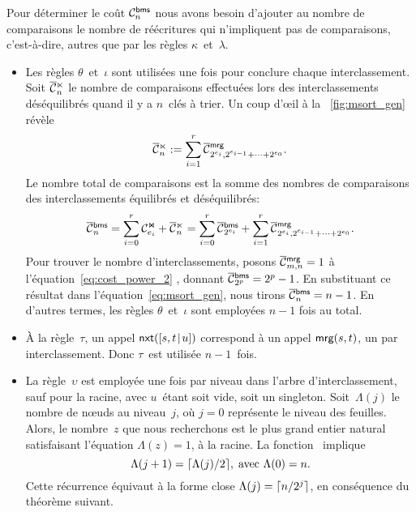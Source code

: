 Pour déterminer le coût
\(\C{\fun{bms}}{n}\) nous avons besoin
d'ajouter au nombre de comparaisons le nombre de réécritures qui
n'impliquent pas de comparaisons, c'est-à-dire, autres que par les
règles \(\kappa\)~et~\(\lambda\).
\begin{itemize}

\item Les règles \(\theta\)~et~\(\iota\) sont utilisées une fois pour
  conclure chaque interclassement. Soit
  \(\OC{\ltimes}{n}\) le nombre de
  comparaisons effectuées lors des interclassements déséquilibrés
  quand il y a \(n\)~clés à trier. Un coup d'{\oe}il à la
  \fig~\vref{fig:msort_gen} révèle
    \begin{equation}
      \OC{\ltimes}{n} :=
      \sum_{i=1}^{r}{\OC{\fun{mrg}}{2^{e_i},2^{e_{i-1}}+\dots+2^{e_0}}}.
      \label{eq:C_unbal}
    \end{equation}
    Le nombre total de comparaisons est la somme des nombres de
    comparaisons des interclassements équilibrés et déséquilibrés:
    \begin{equation}
      \OC{\fun{bms}}{n}
      = \sum_{i=0}^{r}{\C{\Join}{e_i}}
      +
      \OC{\ltimes}{n}
      = \sum_{i=0}^{r}{\OC{\fun{bms}}{2^{e_i}}}
      +
      \sum_{i=1}^{r}{\OC{\fun{mrg}}{2^{e_i},2^{e_{i-1}}+\dots+2^{e_0}}}.
      \label{eq:msort_gen}
    \end{equation}
    Pour trouver le nombre d'interclassements, posons
    \(\OC{\fun{mrg}}{m,n} = 1\) à l'équation~\eqref{eq:cost_power_2}
    , donnant \(\OC{\fun{bms}}{2^p} = 2^p -
    1\). En substituant ce résultat dans
    l'équation~\eqref{eq:msort_gen}, nous tirons \(\OC{\fun{bms}}{n} =
    n - 1\). En d'autres termes, les règles \(\theta\)~et~\(\iota\)
    sont employées \(n-1\)\label{eq:bms_merges} fois au
    total.

  \item À la règle~\(\tau\), un appel
    \(\fun{nxt}(\cons{s,t}{u})\) correspond à
    un appel \(\fun{mrg}(s,t)\), un par
    interclassement. Donc \(\tau\)~est utilisée \(n-1\)~fois.

  \item La règle~\(\upsilon\) est employée une fois par niveau dans
    l'arbre d'interclassement,
    sauf pour la racine, avec \(u\)~étant soit vide, soit un
    singleton. Soit~\(\Lambda(j)\) le nombre de n{\oe}uds au
    niveau~\(j\), où \(j=0\) représente le niveau des feuilles. Alors,
    le nombre~\(z\) que nous recherchons est le plus grand entier
    natural satisfaisant l'équation \(\Lambda(z) = 1\), à la racine.
    La fonction~ implique
    \begin{equation*}
      \Lambda(j+1) = \ceiling{\Lambda(j)/2},\; \text{avec \(\Lambda(0)
        = n\)}.
    \end{equation*}
    Cette récurrence équivaut à la forme close \(\Lambda(j) =
    \ceiling{n/2^j}\), en conséquence du théorème suivant.


\end{itemize}
